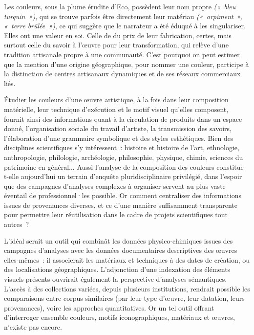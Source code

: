 \documentclass[a4paper,12pt, twoside]{book}
\begin{document}
Les couleurs, sous la plume érudite d’Eco, possèdent leur nom propre \scriptsize\textit{(«~bleu turquin~»)}\normalsize, qui se trouve parfois être directement leur matériau \scriptsize\textit{(«~orpiment~», «~terre brûlée~»)}\normalsize, ce qui suggère que le narrateur a été éduqué à les singulariser. Elles ont une valeur en soi. Celle de du prix de leur fabrication, certes, mais surtout celle du savoir à l’œuvre pour leur transformation, qui relève d’une tradition artisanale propre à une communauté. C’est pourquoi on peut estimer que la mention d’une origine géographique, pour nommer une couleur, participe à la distinction de centres artisanaux dynamiques et de ses réseaux commerciaux liés.

Étudier les couleurs d’une œuvre artistique, à la fois dans leur composition matérielle, leur technique d’exécution et le motif visuel qu’elles composent, fournit ainsi des informations quant à la circulation de produits dans un espace donné, l’organisation sociale du travail d’artiste, la transmission des savoirs, l’élaboration d’une grammaire symbolique et des styles esthétiques. Bien des disciplines scientifiques s’y intéressent~: histoire et histoire de l’art, ethnologie, anthropologie, philologie, archéologie, philosophie, physique, chimie, sciences du patrimoine en général... Aussi l’analyse de la composition des couleurs constitue-t-elle aujourd’hui un terrain d’enquête pluridisciplinaire privilégié, dans l’espoir que des campagnes d’analyses complexes à organiser servent au plus vaste éventail de professionnel·les possible. Or comment centraliser des informations issues de provenances diverses, et ce d’une manière suffisamment transparente pour permettre leur réutilisation dans le cadre de projets scientifiques tout autres~?

L’idéal serait un outil qui combinât les données physico-chimiques issues des campagnes d’analyses avec les données documentaires descriptives des œuvres elles-mêmes~: il associerait les matériaux et techniques à des dates de création, ou des localisations géographiques. L’adjonction d’une indexation des éléments visuels présents ouvrirait également la perspective d’analyses sémantiques. L’accès à des collections variées, depuis plusieurs institutions, rendrait possible les comparaisons entre corpus similaires (par leur type d’œuvre, leur datation, leurs provenances), voire les approches quantitatives. Or un tel outil offrant d’interroger ensemble couleurs, motifs iconographiques, matériaux et œuvres, n’existe pas encore.
\end{document}

